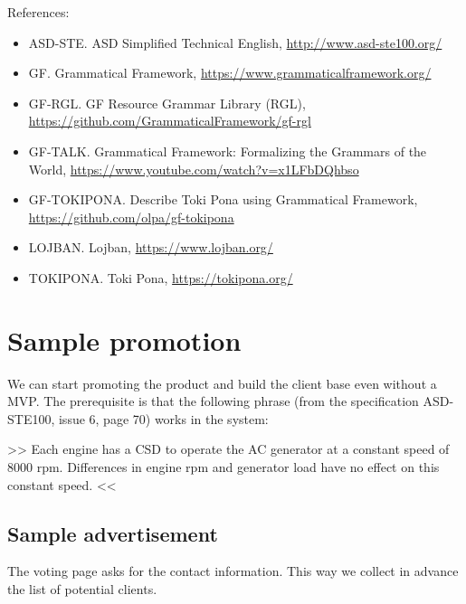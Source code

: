 \documentclass{article}
\begin{document}
References:

\begin{itemize}
\item ASD-STE. ASD Simplified Technical English, \url{http://www.asd-ste100.org/}
\item GF. Grammatical Framework, \url{https://www.grammaticalframework.org/}
\item GF-RGL. GF Resource Grammar Library (RGL), \url{https://github.com/GrammaticalFramework/gf-rgl}
\item GF-TALK. Grammatical Framework: Formalizing the Grammars of the World, \url{https://www.youtube.com/watch?v=x1LFbDQhbso}
\item GF-TOKIPONA. Describe Toki Pona using Grammatical Framework, \url{https://github.com/olpa/gf-tokipona}
\item LOJBAN. Lojban, \url{https://www.lojban.org/}
\item TOKIPONA. Toki Pona, \url{https://tokipona.org/}
\end{itemize}


\section{Sample promotion}\label{promotion}

We can start promoting the product and build the client base even without a MVP. The prerequisite is that the following phrase (from the specification ASD-STE100, issue 6, page 70) works in the system:

>> Each engine has a CSD to operate the AC generator at a constant speed of 8000 rpm. Differences in engine rpm and generator load have no effect on this constant speed. <<

\subsection{Sample advertisement}


The voting page asks for the contact information. This way we collect in advance the list of potential clients.
\end{document}
